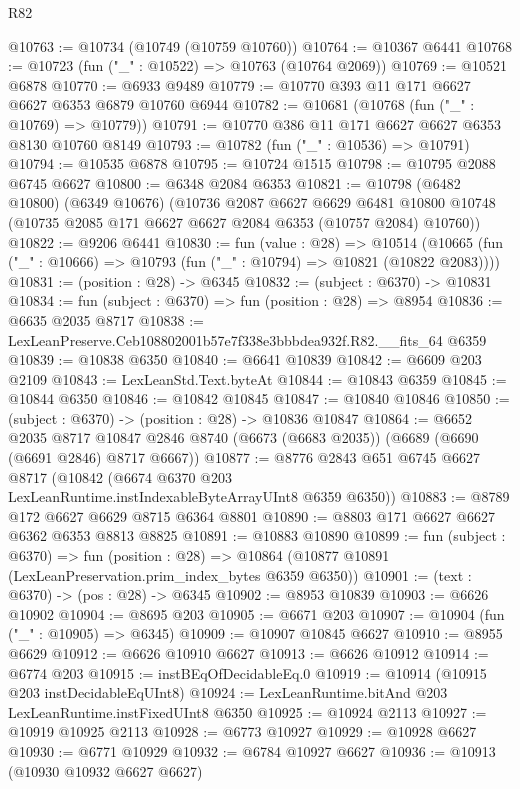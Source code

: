 \begin{lexlean}{R82}
\begin{coremodule}
@10763 := @10734 (@10749 (@10759 @10760))
@10764 := @10367 @6441
@10768 := @10723 (fun ("_" : @10522) => @10763 (@10764 @2069))
@10769 := @10521 @6878
@10770 := @6933 @9489
@10779 := @10770 @393 @11 @171 @6627 @6627 @6353 @6879 @10760 @6944
@10782 := @10681 (@10768 (fun ("_" : @10769) => @10779))
@10791 := @10770 @386 @11 @171 @6627 @6627 @6353 @8130 @10760 @8149
@10793 := @10782 (fun ("_" : @10536) => @10791)
@10794 := @10535 @6878
@10795 := @10724 @1515
@10798 := @10795 @2088 @6745 @6627
@10800 := @6348 @2084 @6353
@10821 := @10798
    (@6482 @10800)
    (@6349 @10676)
    (@10736
      @2087
      @6627
      @6629
      @6481
      @10800
      @10748
      (@10735 @2085 @171 @6627 @6627 @2084 @6353 (@10757 @2084) @10760))
@10822 := @9206 @6441
@10830 := fun (value : @28) =>
  @10514 (@10665 (fun ("_" : @10666) => @10793 (fun ("_" : @10794) => @10821 (@10822 @2083))))
@10831 := (position : @28) -> @6345
@10832 := (subject : @6370) -> @10831
@10834 := fun (subject : @6370) => fun (position : @28) => @8954
@10836 := @6635 @2035 @8717
@10838 := LexLeanPreserve.Ceb108802001b57e7f338e3bbbdea932f.R82.__fits_64 @6359
@10839 := @10838 @6350
@10840 := @6641 @10839
@10842 := @6609 @203 @2109
@10843 := LexLeanStd.Text.byteAt
@10844 := @10843 @6359
@10845 := @10844 @6350
@10846 := @10842 @10845
@10847 := @10840 @10846
@10850 := (subject : @6370) -> (position : @28) -> @10836 @10847
@10864 := @6652
    @2035
    @8717
    @10847
    @2846
    @8740
    (@6673 (@6683 @2035))
    (@6689 (@6690 (@6691 @2846) @8717 @6667))
@10877 := @8776
    @2843
    @651
    @6745
    @6627
    @8717
    (@10842 (@6674 @6370 @203 LexLeanRuntime.instIndexableByteArrayUInt8 @6359 @6350))
@10883 := @8789 @172 @6627 @6629 @8715 @6364 @8801
@10890 := @8803 @171 @6627 @6627 @6362 @6353 @8813 @8825
@10891 := @10883 @10890
@10899 := fun (subject : @6370) =>
  fun (position : @28) => @10864 (@10877 @10891 (LexLeanPreservation.prim_index_bytes @6359 @6350))
@10901 := (text : @6370) -> (pos : @28) -> @6345
@10902 := @8953 @10839
@10903 := @6626 @10902
@10904 := @8695 @203
@10905 := @6671 @203
@10907 := @10904 (fun ("_" : @10905) => @6345)
@10909 := @10907 @10845 @6627
@10910 := @8955 @6629
@10912 := @6626 @10910 @6627
@10913 := @6626 @10912
@10914 := @6774 @203
@10915 := instBEqOfDecidableEq.{0}
@10919 := @10914 (@10915 @203 instDecidableEqUInt8)
@10924 := LexLeanRuntime.bitAnd @203 LexLeanRuntime.instFixedUInt8 @6350
@10925 := @10924 @2113
@10927 := @10919 @10925 @2113
@10928 := @6773 @10927
@10929 := @10928 @6627
@10930 := @6771 @10929
@10932 := @6784 @10927 @6627
@10936 := @10913 (@10930 @10932 @6627 @6627)

\end{coremodule}
\end{lexlean}
